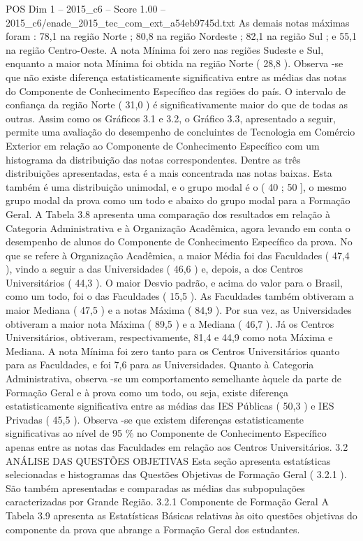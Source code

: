 \begin{textsample}{POS Dim 1 – 2015\_c6 – Score 1.00 – 2015\_c6/enade\_2015\_tec\_com\_ext\_a54eb9745d.txt}
As demais notas máximas foram : 78,1 na região Norte ; 80,8 na região Nordeste ; 82,1 na região Sul ; e 55,1 na região Centro-Oeste.
A nota Mínima foi zero nas regiões Sudeste e Sul, enquanto a maior nota Mínima foi obtida na região Norte ( 28,8 ).
Observa -se que não existe diferença estatisticamente significativa entre as médias das notas do Componente de Conhecimento Específico das regiões do país.
O intervalo de confiança da região Norte ( 31,0 ) é significativamente maior do que de todas as outras.
Assim como os Gráficos 3.1 e 3.2, o Gráfico 3.3, apresentado a seguir, permite uma avaliação do desempenho de concluintes de Tecnologia em Comércio Exterior em relação ao Componente de Conhecimento Específico com um histograma da distribuição das notas correspondentes.
Dentre as três distribuições apresentadas, esta é a mais concentrada nas notas baixas.
Esta também é uma distribuição unimodal, e o grupo modal é o ( 40 ; 50 ], o mesmo grupo modal da prova como um todo e abaixo do grupo modal para a Formação Geral.
A Tabela 3.8 apresenta uma comparação dos resultados em relação à Categoria Administrativa e à Organização Acadêmica, agora levando em conta o desempenho de alunos do Componente de Conhecimento Específico da prova.
No que se refere à Organização Acadêmica, a maior Média foi das Faculdades ( 47,4 ), vindo a seguir a das Universidades ( 46,6 ) e, depois, a dos Centros Universitários ( 44,3 ).
O maior Desvio padrão, e acima do valor para o Brasil, como um todo, foi o das Faculdades ( 15,5 ).
As Faculdades também obtiveram a maior Mediana ( 47,5 ) e a notas Máxima ( 84,9 ).
Por sua vez, as Universidades obtiveram a maior nota Máxima ( 89,5 ) e a Mediana ( 46,7 ).
Já os Centros Universitários, obtiveram, respectivamente, 81,4 e 44,9 como nota Máxima e Mediana.
A nota Mínima foi zero tanto para os Centros Universitários quanto para as Faculdades, e foi 7,6 para as Universidades.
Quanto à Categoria Administrativa, observa -se um comportamento semelhante àquele da parte de Formação Geral e à prova como um todo, ou seja, existe diferença estatisticamente significativa entre as médias das IES Públicas ( 50,3 ) e IES Privadas ( 45,5 ).
Observa -se que existem diferenças estatisticamente significativas ao nível de 95 \% no Componente de Conhecimento Específico apenas entre as notas das Faculdades em relação aos Centros Universitários. 3.2 ANÁLISE DAS QUESTÕES OBJETIVAS Esta seção apresenta estatísticas selecionadas e histogramas das Questões Objetivas de Formação Geral ( 3.2.1 ).
São também apresentadas e comparadas as médias das subpopulações caracterizadas por Grande Região. 3.2.1 Componente de Formação Geral A Tabela 3.9 apresenta as Estatísticas Básicas relativas às oito questões objetivas do componente da prova que abrange a Formação Geral dos estudantes.

\end{textsample}
